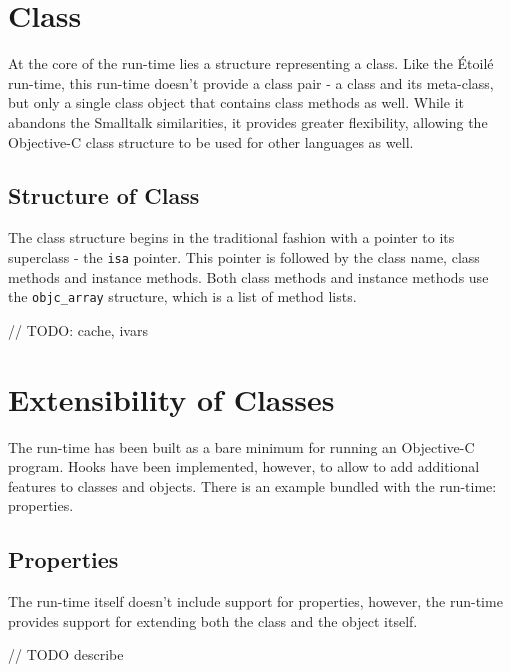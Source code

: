 \section{Class}

At the core of the run-time lies a structure representing a class. Like the \'Etoil\'e run-time, this run-time doesn't provide a class pair - a class and its meta-class, but only a single class object that contains class methods as well. While it abandons the Smalltalk similarities, it provides greater flexibility, allowing the Objective-C class structure to be used for other languages as well.

\subsection{Structure of Class}

The class structure begins in the traditional fashion with a pointer to its superclass - the \verb=isa= pointer. This pointer is followed by the class name, class methods and instance methods. Both class methods and instance methods use the \verb=objc_array= structure, which is a list of method lists.

// TODO: cache, ivars

\section{Extensibility of Classes}

The run-time has been built as a bare minimum for running an Objective-C program. Hooks have been implemented, however, to allow to add additional features to classes and objects. There is an example bundled with the run-time: properties.

\subsection{Properties}

The run-time itself doesn't include support for properties, however, the run-time provides support for extending both the class and the object itself.

// TODO describe